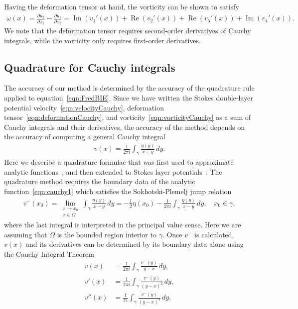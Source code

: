 \documentclass[3p]{elsarticle}
\renewcommand{\Re}{{\operatorname{Re}}}
\renewcommand{\Im}{{\operatorname{Im}}}
\newcommand{\pderiv}[2]{\frac{\partial #1}{\partial #2}}
\begin{document}
Having the deformation tensor at hand, the vorticity can be shown to
satisfy
\begin{align}
  \omega(x) = \pderiv{u_2}{x_1} - \pderiv{u_1}{x_2} = 
     \Im(v_1'(x)) + \Re(v_2'(x)) + \Re(v_5'(x)) + \Im(v_4'(x)).
  \label{eqn:vorticityCauchy}
\end{align}
We note that the deformation tensor requires second-order derivatives of
Cauchy integrals, while the vorticity only requires first-order
derivatives.

\subsection{Quadrature for Cauchy integrals}
The accuracy of our method is determined by the accuracy of the
quadrature rule applied to equation~\eqref{eqn:FredBIE}. Since we have
written the Stokes double-layer potential
velocity~\eqref{eqn:velocityCauchy}, deformation
tensor~\eqref{eqn:deformationCauchy}, and
vorticity~\eqref{eqn:vorticityCauchy} as a sum of Cauchy integrals and
their derivatives, the accuracy of the method depends on the accuracy of
computing a general Cauchy integral
\begin{align}
  v(x) = \frac{1}{2\pi i} \int_{\gamma} \frac{\eta(y)}{x-y} \, dy.
  \label{eqn:cauchy1}
\end{align}
Here we describe a quadrature formulae that was first used to
approximate analytic functions~\cite{ioa-pap-per1991}, and then extended
to Stokes layer potentials~\cite{bar-wu-vee2015}. The quadrature method
requires the boundary data of the analytic function~\eqref{eqn:cauchy1}
which satisfies the Sokhotski-Plemelj jump relation
\begin{align}
  v^{-}(x_0) = \lim_{\substack{x \rightarrow x_0 \\ x \in \Omega}} \int_{\gamma}
    \frac{\eta(y)}{x-y}\, dy = -\frac{1}{2}\eta(x_0) - 
    \frac{1}{2\pi i} \int_{\gamma} \frac{\eta(y)}{x-y} \, dy,
    \quad x_0 \in \gamma,
    \label{eqn:SP}
\end{align}
where the last integral is interpreted in the principal value sense.
Here we are assuming that $\Omega$ is the bounded region interior to
$\gamma$. Once $v^{-}$ is calculated, $v(x)$ and its derivatives can be
determined by its boundary data alone using the Cauchy Integral Theorem
\begin{subequations}
  \label{eqn:cauchy}
  \begin{alignat}{3}
  \label{eqn:cauchyv}
  v(x) &= \frac{1}{2\pi i}\int_{\gamma} 
    \frac{v^{-}(y)}{y-x} \,dy, \\
  v'(x) &= \frac{1}{2\pi i} \int_{\gamma}
    \frac{v^{-}(y)}{(y-x)^2} \, dy, \\
  v''(x) &= \frac{1}{\pi i} \int_{\gamma}
    \frac{v^{-}(y)}{(y-x)^3} \, dy.
  \end{alignat}
\end{subequations}
\end{document}
